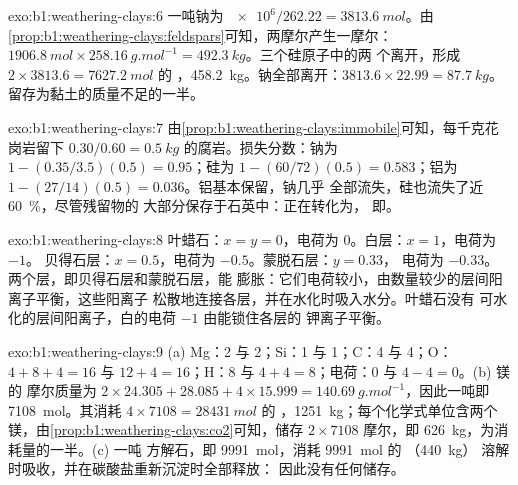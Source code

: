\begin{solution}{exo:b1:weathering-clays:6}
一吨钠为 $\num{e6}/262.22 = \qty{3813.6}{mol}$。由
\cref{prop:b1:weathering-clays:feldspars}可知，两摩尔产生一摩尔：
$\qty{1906.8}{mol} \times \qty{258.16}{g.mol^{-1}} = \qty{492.3}{kg}$。三个硅原子中的两
个离开，形成 $2\times3813.6 = \qty{7627.2}{mol}$ 的
，\qty{458.2}{kg}。钠全部离开：$3813.6\times22.99 =
\qty{87.7}{kg}$。留存为黏土的质量不足的一半。
\end{solution}

\begin{solution}{exo:b1:weathering-clays:7}
由\cref{prop:b1:weathering-clays:immobile}可知，每千克花岗岩留下
$0.30/0.60 = \qty{0.5}{kg}$ 的腐岩。损失分数：钠为 $1 -
(0.35/3.5)(0.5) = 0.95$；硅为 $1 - (60/72)(0.5) = 0.583$；铝为 $1 -
(27/14)(0.5) = 0.036$。铝基本保留，钠几乎
全部流失，硅也流失了近 \qty{60}{\percent}，尽管残留物的
大部分保存于石英中：正在转化为，
即。
\end{solution}

\begin{solution}{exo:b1:weathering-clays:8}
叶蜡石：$x = y = 0$，电荷为 0。白层：$x = 1$，电荷为 $-1$。
贝得石层：$x = 0.5$，电荷为 $-0.5$。蒙脱石层：$y = 0.33$，
电荷为 $-0.33$。两个层，即贝得石层和蒙脱石层，能
膨胀：它们电荷较小，由数量较少的层间阳离子平衡，这些阳离子
松散地连接各层，并在水化时吸入水分。叶蜡石没有
可水化的层间阳离子，白的电荷 $-1$ 由能锁住各层的
钾离子平衡。
\end{solution}

\begin{solution}{exo:b1:weathering-clays:9}
(a) Mg：2 与 2；Si：1 与 1；C：4 与 4；O：$4 + 8 + 4 = 16$ 与 $12 + 4 =
16$；H：8 与 $4 + 4 = 8$；电荷：0 与 $4 - 4 = 0$。(b) 镁的
摩尔质量为 $2\times24.305 + 28.085 + 4\times15.999 =
\qty{140.69}{g.mol^{-1}}$，因此一吨即 \qty{7108}{mol}。其消耗
$4\times7108 = \qty{28431}{mol}$ 的 ，\qty{1251}{kg}；每个化学式单位含两个
镁，由\cref{prop:b1:weathering-clays:co2}可知，储存
$2\times7108$ 摩尔，即 \qty{626}{kg}，为消耗量的一半。(c) 一吨
方解石，即 \qty{9991}{mol}，消耗 \qty{9991}{mol} 的 （\qty{440}{kg}）
溶解时吸收，并在碳酸盐重新沉淀时全部释放：
因此没有任何储存。
\end{solution}

